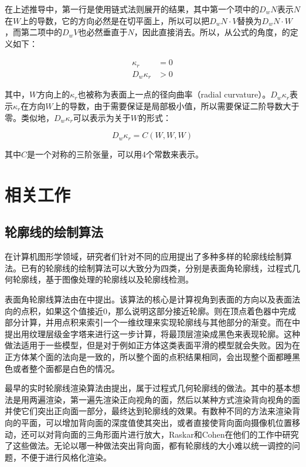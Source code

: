 在上述推导中，第一行是使用链式法则展开的结果，其中第一个项中的$D_w{N}$表示$N$在$W$上的导数，它的方向必然是在切平面上，所以可以把$D_w{N}\cdot{V}$替换为$D_w{N}\cdot{W}$，而第二项中的$D_w{V}$也必然垂直于$N$，因此直接消去。所以，从公式的角度，\scon{}的定义如下：

\begin{align}
  \kappa_r &= 0\\
  D_w\kappa_r &> 0
\end{align}

其中，$W$方向上的$\kappa_r$也被称为表面上一点的径向曲率（radial curvature）。$D_w\kappa_r$表示$\kappa_r$在方向$W$上的导数，由于需要保证是局部极小值，所以需要保证二阶导数大于零。类似地，$D_w\kappa_r$可以表示为关于$W$的形式：

\begin{equation}
    D_w\kappa_r = C(W, W, W)
\end{equation}

其中$C$是一个对称的三阶张量，可以用4个常数来表示。

\section{相关工作}

\subsection{轮廓线的绘制算法}

在计算机图形学领域，研究者们针对不同的应用提出了多种多样的轮廓线绘制算法。已有的轮廓线的绘制算法可以大致分为四类，分别是表面角轮廓线，过程式几何轮廓线，基于图像处理的轮廓线以及轮廓线检测。

表面角轮廓线算法由\citeauthor{gooch1999interactive}在\cite{gooch1999interactive}中提出。该算法的核心是计算视角到表面的方向以及表面法向的点积，如果这个值接近0，那么说明这部分接近轮廓。\citeauthor{marshall2001cartoon}\cite{marshall2001cartoon}则在顶点着色器中完成部分计算，并用点积来索引一个一维纹理来实现轮廓线与其他部分的渐变。而\citeauthor{everitt2002one}在\cite{everitt2002one}中提出用纹理层级金字塔来进行这一步计算，将最顶层渲染成黑色来表现轮廓。这种做法适用于一些模型，但是对于例如正方体这类表面平滑的模型就会失败。因为在正方体某个面的法向是一致的，所以整个面的点积结果相同，会出现整个面都睡黑色或者整个面都是白色的情况。

最早的实时轮廓线渲染算法由\citeauthor{rossignac1992hidden}\cite{rossignac1992hidden}提出，属于过程式几何轮廓线的做法。其中的基本想法是用两遍渲染，第一遍先渲染正向视角的面，然后以某种方式渲染背向视角的面并使它们突出正向面一部分，最终达到轮廓线的效果。有数种不同的方法来渲染背向的平面，可以增加背向面的深度值使其突出，或者直接使背向面向摄像机位置移动，还可以对背向面的三角形面片进行放大，Raskar和Cohen在他们的工作\cite{raskar1999image}中研究了这些做法。无论以哪一种做法突出背向面，都有轮廓线的大小难以统一调控的问题，不便于进行风格化渲染。


